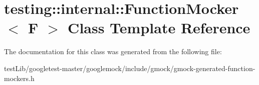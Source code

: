 \hypertarget{classtesting_1_1internal_1_1FunctionMocker}{}\section{testing\+:\+:internal\+:\+:Function\+Mocker$<$ F $>$ Class Template Reference}
\label{classtesting_1_1internal_1_1FunctionMocker}


The documentation for this class was generated from the following file\+:\begin{DoxyCompactItemize}
\item 
test\+Lib/googletest-\/master/googlemock/include/gmock/gmock-\/generated-\/function-\/mockers.\+h\end{DoxyCompactItemize}

